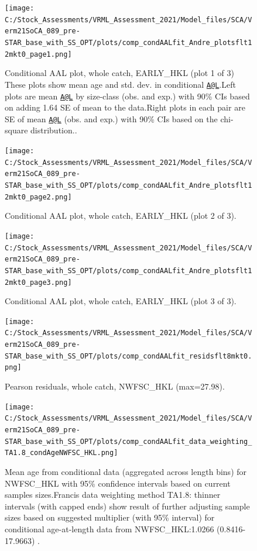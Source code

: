 \documentclass[11pt,
  english,
  a4paper,
]{article}
\begin{document}
\begin{figure}
\centering
\texttt{[image: C:/Stock\_Assessments/VRML\_Assessment\_2021/Model\_files/SCA/Verm21SoCA\_089\_pre-STAR\_base\_with\_SS\_OPT/plots/comp\_condAALfit\_Andre\_plotsflt12mkt0\_page1.png]}
\caption{Conditional AAL plot, whole catch, EARLY\_HKL (plot 1 of 3) These plots show mean age and std. dev. in conditional {\href{mailto:A@L}{\nolinkurl{A@L}}\leavevmode\tagmcend\tagstructend}.Left plots are mean {\href{mailto:A@L}{\nolinkurl{A@L}}\leavevmode\tagmcend\tagstructend} by size-class (obs. and exp.) with 90\% CIs based on adding 1.64 SE of mean to the data.Right plots in each pair are SE of mean {\href{mailto:A@L}{\nolinkurl{A@L}}\leavevmode\tagmcend\tagstructend} (obs. and exp.) with 90\% CIs based on the chi-square distribution..\label{fig:comp_condAALfit_Andre_plotsflt12mkt0_page1}}
\end{figure}

\begin{figure}
\centering
\texttt{[image: C:/Stock\_Assessments/VRML\_Assessment\_2021/Model\_files/SCA/Verm21SoCA\_089\_pre-STAR\_base\_with\_SS\_OPT/plots/comp\_condAALfit\_Andre\_plotsflt12mkt0\_page2.png]}
\caption{Conditional AAL plot, whole catch, EARLY\_HKL (plot 2 of 3).\label{fig:comp_condAALfit_Andre_plotsflt12mkt0_page2}}
\end{figure}

\begin{figure}
\centering
\texttt{[image: C:/Stock\_Assessments/VRML\_Assessment\_2021/Model\_files/SCA/Verm21SoCA\_089\_pre-STAR\_base\_with\_SS\_OPT/plots/comp\_condAALfit\_Andre\_plotsflt12mkt0\_page3.png]}
\caption{Conditional AAL plot, whole catch, EARLY\_HKL (plot 3 of 3).\label{fig:comp_condAALfit_Andre_plotsflt12mkt0_page3}}
\end{figure}

\begin{figure}
\centering
\texttt{[image: C:/Stock\_Assessments/VRML\_Assessment\_2021/Model\_files/SCA/Verm21SoCA\_089\_pre-STAR\_base\_with\_SS\_OPT/plots/comp\_condAALfit\_residsflt8mkt0.png]}
\caption{Pearson residuals, whole catch, NWFSC\_HKL (max=27.98).\label{fig:comp_condAALfit_residsflt8mkt0}}
\end{figure}

\begin{figure}
\centering
\texttt{[image: C:/Stock\_Assessments/VRML\_Assessment\_2021/Model\_files/SCA/Verm21SoCA\_089\_pre-STAR\_base\_with\_SS\_OPT/plots/comp\_condAALfit\_data\_weighting\_TA1.8\_condAgeNWFSC\_HKL.png]}
\caption{Mean age from conditional data (aggregated across length bins) for NWFSC\_HKL with 95\% confidence intervals based on current samples sizes.Francis data weighting method TA1.8: thinner intervals (with capped ends) show result of further adjusting sample sizes based on suggested multiplier (with 95\% interval) for conditional age-at-length data from NWFSC\_HKL:1.0266 (0.8416-17.9663) .\label{fig:comp_condAALfit_data_weighting_TA1.8_condAgeNWFSC_HKL}}
\end{figure}
\end{document}
